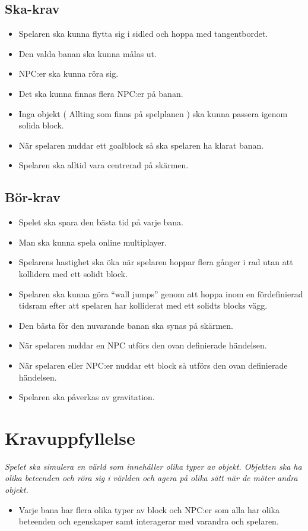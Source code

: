 \documentclass{TDP003mall}
\begin{document}
\subsection{Ska-krav}
\begin{itemize}
\item Spelaren ska kunna flytta sig i sidled och hoppa med tangentbordet.
\item Den valda banan ska kunna målas ut.
\item NPC:er ska kunna röra sig.
\item Det ska kunna finnas flera NPC:er på banan.
\item Inga objekt ( Allting som finns på spelplanen ) ska kunna passera igenom solida block.
\item När spelaren nuddar ett goalblock så ska spelaren ha klarat banan.
\item Spelaren ska alltid vara centrerad på skärmen.
\end{itemize}

\subsection{Bör-krav}
\begin{itemize}
\item Spelet ska spara den bästa tid på varje bana.
\item Man ska kunna spela online multiplayer.
\item Spelarens hastighet ska öka när spelaren hoppar flera gånger i rad utan att kollidera med ett solidt block.
\item Spelaren ska kunna göra ``wall jumps'' genom att hoppa inom en fördefinierad tidsram efter att spelaren har kolliderat med ett solidts blocks vägg.
\item Den bästa för den nuvarande banan ska synas på skärmen.
\item När spelaren nuddar en NPC utförs den ovan definierade händelsen.
\item När spelaren eller NPC:er nuddar ett block så utförs den ovan definierade händelsen.
\item Spelaren ska påverkas av gravitation.
\end{itemize}

\section{Kravuppfyllelse}
\textit{Spelet ska simulera en värld som innehåller olika typer av objekt. Objekten ska ha olika beteenden och röra
sig i världen och agera på olika sätt när de möter andra objekt.}
\begin{itemize}
\item Varje bana har flera olika typer av block och NPC:er som alla har olika beteenden och egenskaper samt interagerar med varandra och spelaren.
\end{itemize}
\end{document}

